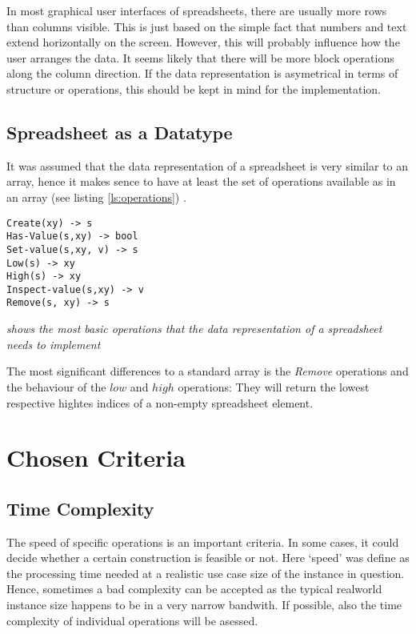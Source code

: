 \documentclass[a4paper,11pt,twoside]{article}
\begin{document}
In most graphical user interfaces of spreadsheets, there are usually
more rows than columns visible. This is just based on the simple fact
that numbers and text extend horizontally on the screen. However, this
will probably influence how the user arranges the data. It seems
likely that there will be more block operations along the column
direction. If the data representation is asymetrical in
terms of structure or operations, this should be kept in mind for the
implementation.  

\subsection{Spreadsheet as a Datatype}
It was assumed that the data representation of a spreadsheet is very
similar to an array, hence it makes sence to have at least the set of
operations available as in an array (see listing \ref{ls:operations})
\cite[pp. 92-95]{janlert2000}.

\begin{listing}
\begin{verbatim}
Create(xy) -> s
Has-Value(s,xy) -> bool
Set-value(s,xy, v) -> s
Low(s) -> xy
High(s) -> xy
Inspect-value(s,xy) -> v
Remove(s, xy) -> s
\end{verbatim}
\caption{\textit{shows the most basic operations that the data
  representation of a spreadsheet needs to implement \label{ls:operations}}}
\end{listing}

The most significant differences to a standard array is the
\textit{Remove} operations and the behaviour of the $low$ and $high$
operations: They will return the lowest respective hightes indices of
a non-empty spreadsheet element. 


\section{Chosen Criteria}
\subsection{Time Complexity}
The speed of specific operations is an important criteria. In some
cases, it could decide whether a certain construction is feasible
or not. Here `speed' was define as the processing time needed at a
realistic use case size of the instance in question. Hence, sometimes
a bad complexity can be accepted as the typical realworld instance
size happens to be in a very narrow bandwith. If possible, also the
time complexity of individual operations will be asessed.    
\end{document}
